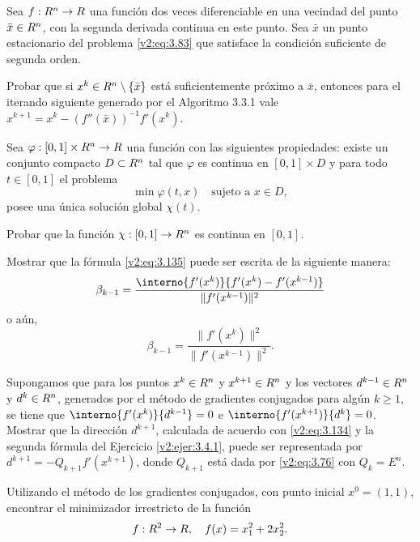 \begin{exercise}\label{v2:ejer:3.3.4}
    Sea $f : R^n \to R$ una función dos veces diferenciable en una vecindad del punto $\bar{x} \in R^n$, con la segunda derivada continua en este punto. Sea $\bar{x}$ un punto estacionario del problema \eqref{v2:eq:3.83} que satisface la condición suficiente de segunda orden.
    
    Probar que si $x^k \in R^n \setminus \{\bar{x}\}$ está suficientemente próximo a $\bar{x}$, entonces para el iterando siguiente generado por el Algoritmo 3.3.1 vale $x^{k+1} = x^k - (f''(\bar{x}))^{-1} f'(x^k)$.
\end{exercise}

\begin{exercise}\label{v2:ejer:3.3.5}
    Sea $\varphi : [0, 1] \times R^n \to R$ una función con las siguientes propiedades: existe un conjunto compacto $D \subset R^n$ tal que $\varphi$ es continua en $[0, 1] \times D$ y para todo $t \in [0, 1]$ el problema
    \[
        \min \varphi(t, x) \quad \text{sujeto a } x \in D,
    \]
    posee una única solución global $\chi(t)$.
    
    Probar que la función $\chi : [0, 1] \to R^n$ es continua en $[0, 1]$.
\end{exercise}

\begin{exercise}\label{v2:ejer:3.4.1}
    Mostrar que la fórmula \eqref{v2:eq:3.135} puede ser escrita de la siguiente manera:
    \[
        \beta_{k-1} = \frac{\interno{f'(x^k)}{f'(x^k) - f'(x^{k-1})}}{\|f'(x^{k-1})\|^2}
    \]
    o aún,
    \[
        \beta_{k-1} = \frac{\|f'(x^k)\|^2}{\|f'(x^{k-1})\|^2}.
    \]
\end{exercise}

\begin{exercise}\label{v2:ejer:3.4.2}
    Supongamos que para los puntos $x^k \in R^n$ y $x^{k+1} \in R^n$ y los vectores $d^{k-1} \in R^n$ y $d^k \in R^n$, generados por el método de gradientes conjugados para algún $k \ge 1$, se tiene que $\interno{f'(x^k)}{d^{k-1}} = 0$ e $\interno{f'(x^{k+1})}{d^k} = 0$. Mostrar que la dirección $d^{k+1}$, calculada de acuerdo con \eqref{v2:eq:3.134} y la segunda fórmula del Ejercicio \ref{v2:ejer:3.4.1}, puede ser representada por $d^{k+1} = -Q_{k+1}f'(x^{k+1})$, donde $Q_{k+1}$ está dada por \eqref{v2:eq:3.76} con $Q_k = E^n$.
\end{exercise}

\begin{exercise}\label{v2:ejer:3.4.3}
    Utilizando el método de los gradientes conjugados, con punto inicial $x^0 = (1, 1)$, encontrar el minimizador irrestricto de la función
    \[
        f : R^2 \to R, \quad f(x) = x_1^2 + 2x_2^2.
    \]
\end{exercise}

